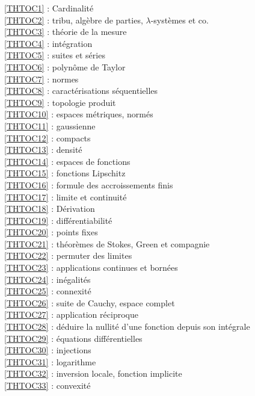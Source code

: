 \ref {THTOC1} : Cardinalité\\
\ref {THTOC2} : tribu, algèbre de parties, \( \lambda \)-systèmes et co.\\
\ref {THTOC3} : théorie de la mesure\\
\ref {THTOC4} : intégration\\
\ref {THTOC5} : suites et séries\\
\ref {THTOC6} : polynôme de Taylor\\
\ref {THTOC7} : normes\\
\ref {THTOC8} : caractérisations séquentielles\\
\ref {THTOC9} : topologie produit\\
\ref {THTOC10} : espaces métriques, normés\\
\ref {THTOC11} : gaussienne\\
\ref {THTOC12} : compacts\\
\ref {THTOC13} : densité\\
\ref {THTOC14} : espaces de fonctions\\
\ref {THTOC15} : fonctions Lipschitz\\
\ref {THTOC16} : formule des accroissements finis\\
\ref {THTOC17} : limite et continuité\\
\ref {THTOC18} : Dérivation\\
\ref {THTOC19} : différentiabilité\\
\ref {THTOC20} : points fixes\\
\ref {THTOC21} : théorèmes de Stokes, Green et compagnie\\
\ref {THTOC22} : permuter des limites\\
\ref {THTOC23} : applications continues et bornées\\
\ref {THTOC24} : inégalités\\
\ref {THTOC25} : connexité\\
\ref {THTOC26} : suite de Cauchy, espace complet\\
\ref {THTOC27} : application réciproque\\
\ref {THTOC28} : déduire la nullité d'une fonction depuis son intégrale\\
\ref {THTOC29} : équations différentielles\\
\ref {THTOC30} : injections\\
\ref {THTOC31} : logarithme\\
\ref {THTOC32} : inversion locale, fonction implicite\\
\ref {THTOC33} : convexité\\
